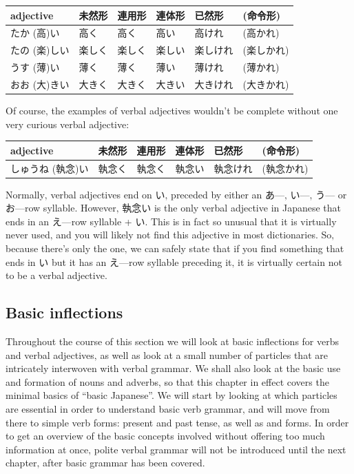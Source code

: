 \documentclass[11pt, b5paper, twoside, openright, onecolumn]{book}
\makeatletter
\newcommand*{\rtrubystack}[2]{{\relscale{0.5}%
  \begin{tabular}[b]{@{}c@{}}%
    {#1}\\%
    {\textscale{2}{#2}}%
  \end{tabular}}%
}
\DeclareRobustCommand*{\rtruby}[2]{%
  \mbox{%
    \setlength{\parskip}{0ex}%
    \BeginAccSupp{method=pdfstringdef,ActualText={#1}}%
      \rtrubystack{\phantom{#2}}{#1}%
      \llap{%
        \rtrubystack{#2}{\phantom{#1}}%
      }%
    \EndAccSupp{}%
  }%
}
\renewcommand*{\rtruby}[2]{#2 (#1)}%
\newenvironment{mytabular}[1]{\noindent\hspace{0.4in}
\begin{tabular}[h]{#1}}{\end{tabular}}
\makeatother
\begin{document}
\vspace{0.5cm}
\smaller
\begin{mytabular}{| l  l  l  l  l  l |}\hline 
\rule{0pt}{2.4ex}adjective & 未然形 & 連用形 & 連体形 & 已然形 & (命令形)\\ 
\hline
\rule{0pt}{3.6ex}\rtruby{高}{たか}い & 高く & 高く & 高い & 高けれ & (高かれ)\\ 
\rule{0pt}{3.6ex}\rtruby{楽}{たの}しい & 楽しく & 楽しく & 楽しい & 楽しけれ & (楽しかれ)\\ 
\rule{0pt}{3.6ex}\rtruby{薄}{うす}い & 薄く & 薄く & 薄い & 薄けれ & (薄かれ)\\ 
\rule{0pt}{3.6ex}\rtruby{大}{おお}きい & 大きく & 大きく & 大きい & 大きけれ & (大きかれ)\\ 
\hline 
\end{mytabular}
\larger
\vspace{0.5cm}


Of course‚ the examples of verbal adjectives wouldn’t be complete without one very curious verbal adjective:

\vspace{0.5cm}
\smaller
\begin{mytabular}{| l  l  l  l  l  l |}\hline 
\rule{0pt}{2.4ex}adjective & 未然形 & 連用形 & 連体形 & 已然形 & (命令形)\\ 
\hline
\rule{0pt}{3.6ex}\rtruby{執念}{しゅうね}い & 執念く & 執念く & 執念い & 執念けれ & (執念かれ)\\ 
\hline 
\end{mytabular}
\larger
\vspace{0.5cm}


Normally‚ verbal adjectives end on い‚ preceded by either an あ—‚ い—‚ う— or お—row syllable. However‚ 執念い is the only verbal adjective in Japanese that ends in an え—row syllable + い. This is in fact so unusual that it is virtually never used‚ and you will likely not find this adjective in most dictionaries. So‚ because there’s only the one‚ we can safely state that if you find something that ends in い but it has an え—row syllable preceding it‚ it is virtually certain not to be a verbal adjective.

\subsection{Basic inflections}

Throughout the course of this section we will look at basic inflections for verbs and verbal adjectives‚ as well as look at a small number of particles that are intricately interwoven with verbal grammar. We shall also look at the basic use and formation of nouns and adverbs‚ so that this chapter in effect covers the minimal basics of “basic Japanese”. We will start by looking at which particles are essential in order to understand basic verb grammar‚ and will move from there to simple verb forms: present and past tense‚ as well as  and  forms. In order to get an overview of the basic concepts involved without offering too much information at once‚ polite verbal grammar will not be introduced until the next chapter‚ after basic grammar has been covered.
\end{document}

